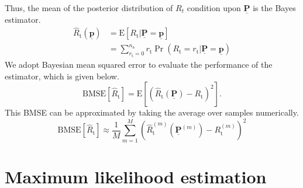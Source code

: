 Thus, the mean of the posterior distribution of $R_{t}$ condition upon $\underline{\mathbf{P}}$ is the Bayes estimator.
\begin{equation} \label{equation:MMSE}
\begin{split}
\hat{R}_{\mathrm{t}} \left( \underline{\mathbf{p}} \right)
&= \mathrm{E} \left[ R_{\mathrm{t}}
| \underline{\mathbf{P}} = \underline{\mathbf{p}} \right] \\
&= \sum_{r_{\mathrm{t}} = 0}^{n_{\mathrm{a}}} r_{\mathrm{t}}
\Pr \left( R_{\mathrm{t}} = r_{\mathrm{t}}
| \underline{\mathbf{P}} = \underline{\mathbf{p}} \right) 
\end{split}
\end{equation}
We adopt Bayesian mean squared error to evaluate the performance of the estimator, which is given below.
\begin{equation} \label{equation:BMSE}
\mathrm{BMSE} \left[ \hat{R}_{\mathrm{t}} \right]
= \mathrm{E} \left[ \left(
\hat{R}_{\mathrm{t}} \left( \underline{\mathbf{P}} \right)
- R_{\mathrm{t}} \right)^2 \right] .
\end{equation}
This BMSE can be approximated by taking the average over samples numerically.
\begin{equation} \label{equation:EmpiricalBMSE}
\mathrm{BMSE} \left[ \hat{R}_{\mathrm{t}} \right]
\approx \frac{1}{M} \sum_{m=1}^M \left(
\hat{R}_{\mathrm{t}}^{(m)} \left( \underline{\mathbf{P}}^{(m)} \right)
- R_{\mathrm{t}}^{(m)} \right)^2 
\end{equation}
\section{Maximum likelihood estimation}

